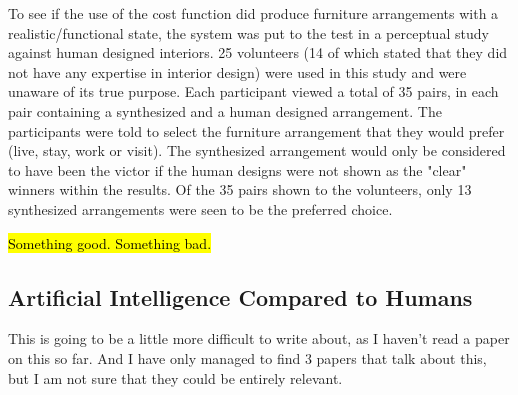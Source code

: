 To see if the use of the cost function did produce furniture arrangements with a realistic/functional state, the system was put to the test in a perceptual study against human designed interiors. 25 volunteers (14 of which stated that they did not have any expertise in interior design) were used in this study and were unaware of its true purpose. Each participant viewed a total of 35 pairs, in each pair containing a synthesized and a human designed arrangement. The participants were told to select the furniture arrangement that they would prefer (live, stay, work or visit). The synthesized arrangement would only be considered to have been the victor if the human designs were not shown as the "clear" winners within the results. Of the 35 pairs shown to the volunteers, only 13 synthesized arrangements were seen to be the preferred choice.

\hl{Something good. Something bad.}

\subsection{Artificial Intelligence Compared to Humans}
This is going to be a little more difficult to write about, as I haven't read a paper on this so far. And I have only managed to find 3 papers that talk about this, but I am not sure that they could be entirely relevant.